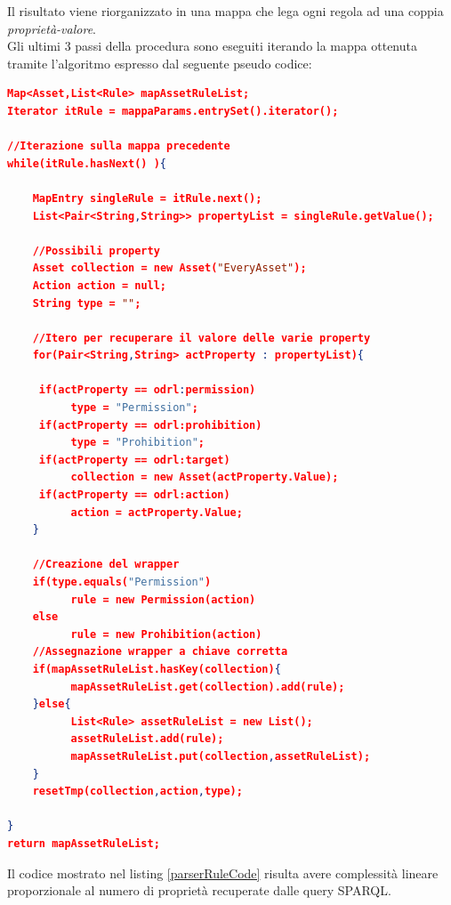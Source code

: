 \documentclass[12pt,a4paper,twoside]{book}
\begin{document}
Il risultato viene riorganizzato in una mappa che lega ogni regola ad una coppia \textit{proprietà-valore}.\\
Gli ultimi 3 passi della procedura sono eseguiti iterando la mappa ottenuta tramite l'algoritmo espresso dal seguente pseudo codice:
\begin{lstlisting}[language=json,firstnumber=1,caption={Pseudo codice per il popolamento della mappa finale},captionpos=b,label=parserRuleCode]
Map<Asset,List<Rule> mapAssetRuleList;
Iterator itRule = mappaParams.entrySet().iterator();

//Iterazione sulla mappa precedente
while(itRule.hasNext() ){

    MapEntry singleRule = itRule.next();
    List<Pair<String,String>> propertyList = singleRule.getValue();
    
    //Possibili property
    Asset collection = new Asset("EveryAsset");
    Action action = null;
    String type = "";
    
    //Itero per recuperare il valore delle varie property
	for(Pair<String,String> actProperty : propertyList){

	 if(actProperty == odrl:permission)
          type = "Permission";
	 if(actProperty == odrl:prohibition)
          type = "Prohibition";
	 if(actProperty == odrl:target)
          collection = new Asset(actProperty.Value);
	 if(actProperty == odrl:action)
	      action = actProperty.Value;
	}
	
    //Creazione del wrapper
    if(type.equals("Permission")
          rule = new Permission(action)
    else
          rule = new Prohibition(action)
    //Assegnazione wrapper a chiave corretta
    if(mapAssetRuleList.hasKey(collection){
          mapAssetRuleList.get(collection).add(rule);     
    }else{
          List<Rule> assetRuleList = new List();
          assetRuleList.add(rule);
          mapAssetRuleList.put(collection,assetRuleList);
    }
    resetTmp(collection,action,type);

}
return mapAssetRuleList;
\end{lstlisting}
Il codice mostrato nel listing \ref{parserRuleCode} risulta avere complessità lineare proporzionale al numero di proprietà recuperate dalle query SPARQL.
\end{document}
